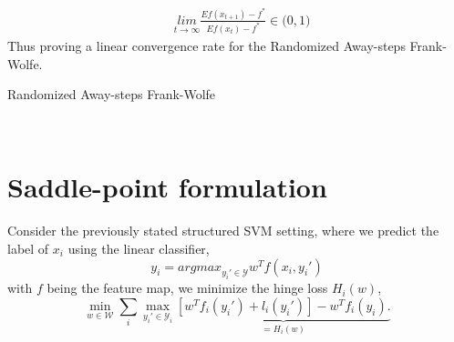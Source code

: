 \documentclass{article}
\begin{document}
\begin{equation*}
\begin{aligned}
    &\underset{t\rightarrow \infty}{\textit{lim}} \frac{E f(x_{t+1})- f^{*}}{E f(x_{t})- f^{*}} \in \big(0,1\big)
\end{aligned}
\end{equation*}
Thus proving a linear convergence rate for the Randomized Away-steps Frank-Wolfe.
\begin{algorithm}[tb]
   \caption{Randomized Away-steps Frank-Wolfe}
   \label{alg:example}
\begin{algorithmic}
    \\
    \ENDFOR
\end{algorithmic}
\end{algorithm}
\section{Saddle-point formulation}
Consider the previously stated structured SVM setting, where we predict the label of $x_{i}$ using the linear classifier,
\begin{equation}
   y_i = \textit{argmax}_{ y_i' \in \mathcal{Y}}  w^T  f( x_i, y_i')
  \label{eq1}
\end{equation}
with $f$ being the feature map, we minimize the hinge loss $H_{i}( w)$,
\begin{equation}
  \min_{ w \in \mathcal{W}} \sum_i \max_{ y_i' \in \mathcal{Y}_i} \underbrace{\left[
 w^T  f_i( y_i') + l_i( y_i') \right] -  w^T  f_i(
y_i).}_{=H_{i}( w)}
\end{equation}
\end{document}
